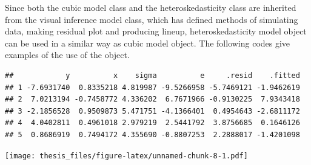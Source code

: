 \documentclass{monashthesis}
\theoremstyle{definition}
\theoremstyle{definition}
\theoremstyle{definition}
\theoremstyle{definition}
\theoremstyle{remark}
\begin{document}
Since both the cubic model class and the heteroskedasticity class are inherited from the visual inference model class, which has defined methods of simulating data, making residual plot and producing lineup, heteroskedasticity model object can be used in a similar way as cubic model object. The following codes give examples of the use of the object.

\begin{Shaded}
\begin{Highlighting}[]
\SpecialCharTok{$}\NormalTok{(}\NormalTok{, } \NormalTok{)}
\end{Highlighting}
\end{Shaded}

\begin{verbatim}
##            y          x    sigma          e     .resid    .fitted
## 1 -7.6931740  0.8335218 4.819987 -9.5266958 -5.7469121 -1.9462619
## 2  7.0213194 -0.7458772 4.336202  6.7671966 -0.9130225  7.9343418
## 3 -2.1856528  0.9509873 5.471751 -4.1366401  0.4954643 -2.6811172
## 4  4.0402811  0.4961018 2.979219  2.5441792  3.8756685  0.1646126
## 5  0.8686919  0.7494172 4.355690 -0.8807253  2.2888017 -1.4201098
\end{verbatim}

\begin{Shaded}
\begin{Highlighting}[]
\SpecialCharTok{$}\SpecialCharTok{$}\NormalTok{(}\NormalTok{, } \NormalTok{), } \NormalTok{)}
\end{Highlighting}
\end{Shaded}

\texttt{[image: thesis\_files/figure-latex/unnamed-chunk-8-1.pdf]}

\begin{Shaded}
\begin{Highlighting}[]
\SpecialCharTok{$}\SpecialCharTok{$}\NormalTok{(}\NormalTok{), } \NormalTok{)}
\end{Highlighting}
\end{Shaded}
\end{document}
